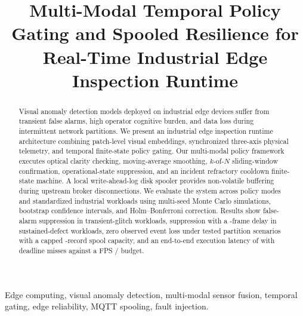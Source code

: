 \documentclass[conference]{IEEEtran}
\begin{document}
\title{Multi-Modal Temporal Policy Gating and Spooled Resilience for Real-Time Industrial Edge Inspection Runtime}

\author{
}

\maketitle

\begin{abstract}
Visual anomaly detection models deployed on industrial edge devices suffer from transient false alarms, high operator cognitive burden, and data loss during intermittent network partitions. We present an industrial edge inspection runtime architecture combining patch-level visual embeddings, synchronized three-axis physical telemetry, and temporal finite-state policy gating. Our multi-modal policy framework executes optical clarity checking, moving-average smoothing, $k$-of-$N$ sliding-window confirmation, operational-state suppression, and an incident refractory cooldown finite-state machine. A local write-ahead-log disk spooler provides non-volatile buffering during upstream broker disconnections. We evaluate the system across \TotalPolicyModes{} policy modes and \TotalWorkloadScenarios{} standardized industrial workloads using multi-seed Monte Carlo simulations, bootstrap confidence intervals, and Holm--Bonferroni correction. Results show \GlitchSuppressionFull{} false-alarm suppression in transient-glitch workloads, \SustainedSuppressionFull{} suppression with a \SustainedMedianDelay{}-frame delay in sustained-defect workloads, zero observed event loss under tested partition scenarios with a capped \SpoolBufferCapacity{}-record spool capacity, and an end-to-end execution latency of \MeanPipelineLatency{} with \DeadlineMissRate{} deadline misses against a \TargetFPS{} FPS / \TargetDeadlineMs{} budget.
\end{abstract}

\begin{IEEEkeywords}
Edge computing, visual anomaly detection, multi-modal sensor fusion, temporal gating, edge reliability, MQTT spooling, fault injection.
\end{IEEEkeywords}
\end{document}
